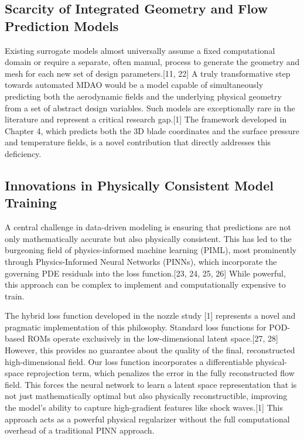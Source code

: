 \documentclass[12pt, a4paper]{report}
\begin{document}
\subsection{Scarcity of Integrated Geometry and Flow Prediction Models}
Existing surrogate models almost universally assume a fixed computational domain or require a separate, often manual, process to generate the geometry and mesh for each new set of design parameters.[11, 22] A truly transformative step towards automated MDAO would be a model capable of simultaneously predicting both the aerodynamic fields and the underlying physical geometry from a set of abstract design variables. Such models are exceptionally rare in the literature and represent a critical research gap.[1] The framework developed in Chapter 4, which predicts both the 3D blade coordinates and the surface pressure and temperature fields, is a novel contribution that directly addresses this deficiency.

\subsection{Innovations in Physically Consistent Model Training}
A central challenge in data-driven modeling is ensuring that predictions are not only mathematically accurate but also physically consistent. This has led to the burgeoning field of physics-informed machine learning (PIML), most prominently through Physics-Informed Neural Networks (PINNs), which incorporate the governing PDE residuals into the loss function.[23, 24, 25, 26] While powerful, this approach can be complex to implement and computationally expensive to train.

The hybrid loss function developed in the nozzle study [1] represents a novel and pragmatic implementation of this philosophy. Standard loss functions for POD-based ROMs operate exclusively in the low-dimensional latent space.[27, 28] However, this provides no guarantee about the quality of the final, reconstructed high-dimensional field. Our loss function incorporates a differentiable physical-space reprojection term, which penalizes the error in the fully reconstructed flow field. This forces the neural network to learn a latent space representation that is not just mathematically optimal but also physically reconstructible, improving the model's ability to capture high-gradient features like shock waves.[1] This approach acts as a powerful physical regularizer without the full computational overhead of a traditional PINN approach.
\end{document}
